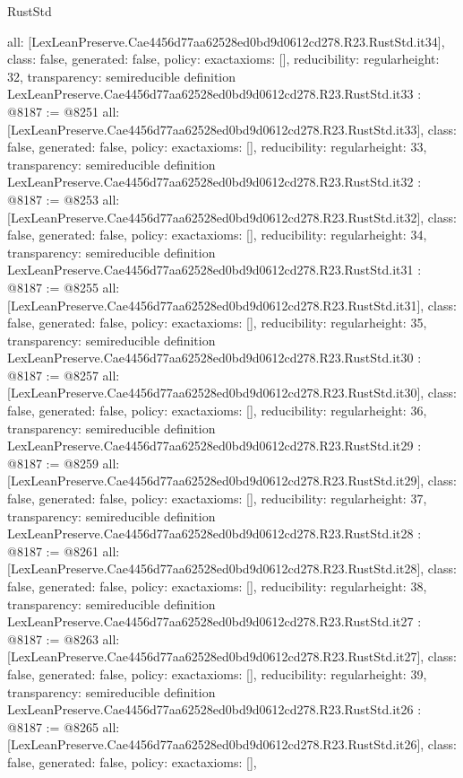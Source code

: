 \begin{lexlean}{RustStd}
\begin{coremodule}
{  all: [LexLeanPreserve.Cae4456d77aa62528ed0bd9d0612cd278.R23.RustStd.it34],
  class: false,
  generated: false,
  policy: exact{axioms: []},
  reducibility: regular{height: 32},
  transparency: semireducible
}
definition LexLeanPreserve.Cae4456d77aa62528ed0bd9d0612cd278.R23.RustStd.it33 : @8187 := @8251 {
  all: [LexLeanPreserve.Cae4456d77aa62528ed0bd9d0612cd278.R23.RustStd.it33],
  class: false,
  generated: false,
  policy: exact{axioms: []},
  reducibility: regular{height: 33},
  transparency: semireducible
}
definition LexLeanPreserve.Cae4456d77aa62528ed0bd9d0612cd278.R23.RustStd.it32 : @8187 := @8253 {
  all: [LexLeanPreserve.Cae4456d77aa62528ed0bd9d0612cd278.R23.RustStd.it32],
  class: false,
  generated: false,
  policy: exact{axioms: []},
  reducibility: regular{height: 34},
  transparency: semireducible
}
definition LexLeanPreserve.Cae4456d77aa62528ed0bd9d0612cd278.R23.RustStd.it31 : @8187 := @8255 {
  all: [LexLeanPreserve.Cae4456d77aa62528ed0bd9d0612cd278.R23.RustStd.it31],
  class: false,
  generated: false,
  policy: exact{axioms: []},
  reducibility: regular{height: 35},
  transparency: semireducible
}
definition LexLeanPreserve.Cae4456d77aa62528ed0bd9d0612cd278.R23.RustStd.it30 : @8187 := @8257 {
  all: [LexLeanPreserve.Cae4456d77aa62528ed0bd9d0612cd278.R23.RustStd.it30],
  class: false,
  generated: false,
  policy: exact{axioms: []},
  reducibility: regular{height: 36},
  transparency: semireducible
}
definition LexLeanPreserve.Cae4456d77aa62528ed0bd9d0612cd278.R23.RustStd.it29 : @8187 := @8259 {
  all: [LexLeanPreserve.Cae4456d77aa62528ed0bd9d0612cd278.R23.RustStd.it29],
  class: false,
  generated: false,
  policy: exact{axioms: []},
  reducibility: regular{height: 37},
  transparency: semireducible
}
definition LexLeanPreserve.Cae4456d77aa62528ed0bd9d0612cd278.R23.RustStd.it28 : @8187 := @8261 {
  all: [LexLeanPreserve.Cae4456d77aa62528ed0bd9d0612cd278.R23.RustStd.it28],
  class: false,
  generated: false,
  policy: exact{axioms: []},
  reducibility: regular{height: 38},
  transparency: semireducible
}
definition LexLeanPreserve.Cae4456d77aa62528ed0bd9d0612cd278.R23.RustStd.it27 : @8187 := @8263 {
  all: [LexLeanPreserve.Cae4456d77aa62528ed0bd9d0612cd278.R23.RustStd.it27],
  class: false,
  generated: false,
  policy: exact{axioms: []},
  reducibility: regular{height: 39},
  transparency: semireducible
}
definition LexLeanPreserve.Cae4456d77aa62528ed0bd9d0612cd278.R23.RustStd.it26 : @8187 := @8265 {
  all: [LexLeanPreserve.Cae4456d77aa62528ed0bd9d0612cd278.R23.RustStd.it26],
  class: false,
  generated: false,
  policy: exact{axioms: []},
}
\end{coremodule}
\end{lexlean}
